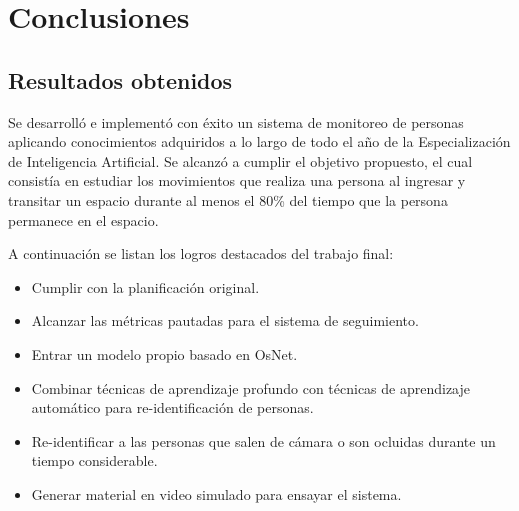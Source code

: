 
\chapter{Conclusiones} %

\label{Chapter5} %




\section{Resultados obtenidos}

Se desarrolló e implementó con éxito un sistema de monitoreo de personas aplicando conocimientos adquiridos a lo largo de todo el año de la Especialización de Inteligencia Artificial. Se alcanzó a cumplir el objetivo propuesto, el cual consistía en estudiar los movimientos que realiza una persona al ingresar y transitar un espacio durante al menos el 80\% del tiempo que la persona permanece en el espacio.

A continuación se listan los logros destacados del trabajo final:
\begin{itemize}
\item Cumplir con la planificación original.
\item Alcanzar las métricas pautadas para el sistema de seguimiento.
\item Entrar un modelo propio basado en OsNet.
\item Combinar técnicas de aprendizaje profundo con técnicas de aprendizaje automático para re-identificación de personas.
\item Re-identificar a las personas que salen de cámara o son ocluidas durante un tiempo considerable.
\item Generar material en video simulado para ensayar el sistema.
\end{itemize}


